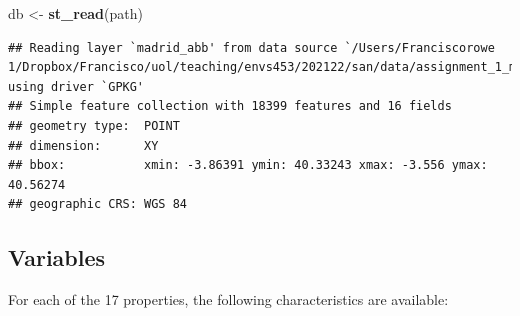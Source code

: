 \documentclass[
]{book}
\newenvironment{Shaded}{\begin{snugshade}}{\end{snugshade}}
\newcommand{\KeywordTok}[1]{\textcolor[rgb]{0.13,0.29,0.53}{\textbf{#1}}}
\newcommand{\NormalTok}[1]{#1}
\newcommand{\StringTok}[1]{\textcolor[rgb]{0.31,0.60,0.02}{#1}}
\begin{document}
\begin{Shaded}
\begin{Highlighting}[]
\NormalTok{db <-}\StringTok{ }\KeywordTok{st_read}\NormalTok{(path)}
\end{Highlighting}
\end{Shaded}

\begin{verbatim}
## Reading layer `madrid_abb' from data source `/Users/Franciscorowe 1/Dropbox/Francisco/uol/teaching/envs453/202122/san/data/assignment_1_madrid/madrid_abb.gpkg' using driver `GPKG'
## Simple feature collection with 18399 features and 16 fields
## geometry type:  POINT
## dimension:      XY
## bbox:           xmin: -3.86391 ymin: 40.33243 xmax: -3.556 ymax: 40.56274
## geographic CRS: WGS 84
\end{verbatim}

\hypertarget{variables}{%
\subsection*{Variables}\label{variables}}

For each of the 17 properties, the following characteristics are available:
\end{document}
